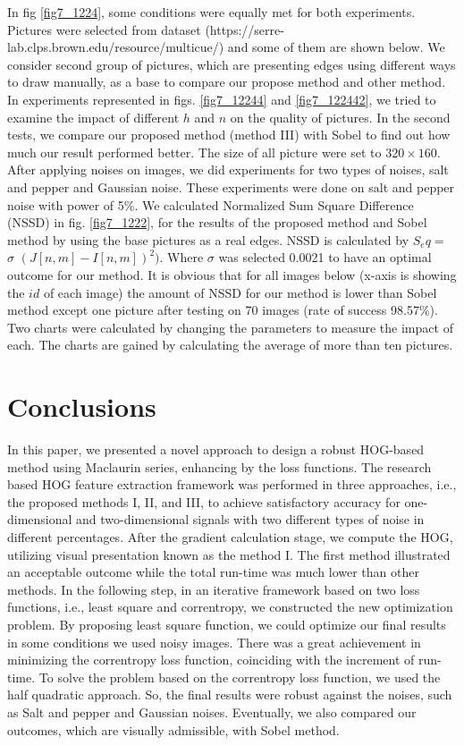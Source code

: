 \documentclass{elsarticle}
\begin{document}
In fig \ref{fig7_1224}, some conditions were equally met for both experiments. Pictures were selected from dataset (https://serre-lab.clps.brown.edu/resource/multicue/) and some of them are shown below. We consider second group of pictures, which are presenting edges using different ways to draw manually, as a base to compare our propose method and other method.
In experiments represented in figs. \ref{fig7_12244} and \ref{fig7_122442}, we tried to examine the impact of different $h$ and $n$ on the quality of pictures. In the second tests, we compare our proposed method (method III) with Sobel to find out how much our result performed better. The size of all picture were set to $320\times 160$.
After applying noises on images, we did experiments for two types of noises, salt and pepper and Gaussian noise. These experiments were done on salt and pepper noise with power of 5\%. We calculated Normalized Sum Square Difference (NSSD) in fig. \ref{fig7_1222}, for the results of the proposed method and Sobel method by using the base pictures as a real edges. NSSD is calculated by $S_eq =$ $\sigma$ $(J[n,m] - I[n,m])^2)$.
Where $\sigma$ was selected 0.0021 to have an optimal outcome for our method. It is obvious that for all images below (x-axis is showing the $id$ of each image) the amount of NSSD for our method is lower than Sobel method except one picture after testing on 70 images (rate of success 98.57\%). Two charts were calculated by changing the parameters to measure the impact of each.
The charts are gained by calculating the average of more than ten pictures.
\section{Conclusions}
In this paper, we presented a novel approach to design a robust HOG-based method using Maclaurin series, enhancing by the loss functions. The research based HOG feature extraction framework was performed in three approaches, i.e., the proposed methods I, II, and III, to achieve satisfactory accuracy for one-dimensional and two-dimensional signals with two different types of noise in different percentages. After the gradient calculation stage, we compute the HOG, utilizing visual presentation known as the method I. The first method illustrated an acceptable outcome while the total run-time was much lower than other methods.
In the following step, in an iterative framework based on two loss functions, i.e., least square and correntropy, we constructed the new optimization problem.
By proposing least square function, we could optimize our final results in some conditions we used noisy images. There was a great achievement in minimizing the correntropy loss function, coinciding with the increment of run-time.
To solve the problem based on the correntropy loss function, we used the half quadratic approach. So, the final results were robust against the noises, such as Salt and pepper and Gaussian noises. Eventually, we also compared our outcomes, which are visually admissible, with Sobel method.
\appendix
\end{document}
